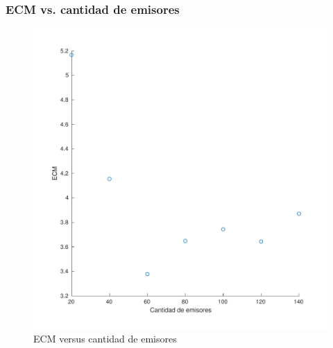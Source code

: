 \documentclass[11pt]{beamer}
\begin{document}
\begin{frame}
\frametitle{ECM vs. cantidad de emisores}

\begin{figure}[H]
    \centering
        
            \includegraphics[scale=0.4]{img/emi_ecm-eps-converted-to.pdf}
            \caption{ECM versus cantidad de emisores}
            \label{fig:ECM versus emisores}
        
    \end{figure}
\end{frame}
\end{document}
